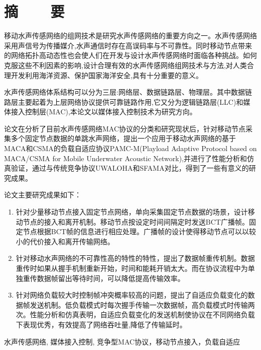 \renewcommand{\baselinestretch}{1.5}
\fontsize{12pt}{13pt}\selectfont


\chapter{摘~~~~要}

移动水声传感网络的组网技术是研究水声传感网络的重要方向之一。水声传感网络采用声信号为传播媒介,水声通信时存在高误码率与不可靠性。同时移动节点带来的网络拓扑高动态性也会使人们在开发与设计水声传感网络时面临各种挑战。如何克服这些不利因素的影响,设计合理有效的水声传感网络组网技术与方法,对人类合理开发利用海洋资源、保护国家海洋安全,具有十分重要的意义。

水声传感网络体系结构可以分为三层:网络层、数据链路层、物理层。其中数据链路层主要起着为上层网络协议提供可靠链路作用,它又分为逻辑链路层(LLC)和媒体接入控制层(MAC),本论文以媒体接入控制技术为研究方向。

论文在分析了目前水声传感网络MAC协议的分类和研究现状后，针对移动节点采集多个固定节点数据的单跳水声网络，提出一个应用于移动水声网络的基于MACA和CSMA的负载自适应协议PAMC-M(Playload Adaptive Protocol based on MACA/CSMA for Mobile Underwater Acoustic Network),并进行了性能分析和仿真验证，通过与传统竞争协议UWALOHA和SFAMA对比，得到了一些有意义的研究成果。

论文主要研究成果如下：
\vspace{-10pt}
\begin{enumerate}
	\item 针对少量移动节点接入固定节点网络，单向采集固定节点数据的场景，设计移动节点的接入和离开机制。移动节点按设定时间间隔定时发送BCT广播帧。固定节点根据BCT帧的信息进行相应处理。广播帧的设计使得移动节点可以以较小的代价接入和离开传输网络。
	\item 针对移动水声网络的不可靠性高的特性的特性，提出了数据帧重传机制。数据重传时如果从握手机制重新开始，时间和能耗开销太大。而在协议流程中为单独重传数据帧留出等待时间，可以降低提高传输效率。
	\item 
	针对网络负载较大时控制帧冲突概率较高的问题，提出了自适应负载变化的数据帧发送机制。低负载模式时每次握手传输一次数据帧，高负载模式时传输两次。性能分析和仿真表明，自适应负载变化的发送机制使协议在不同网络负载下表现优秀，有效提高了网络吞吐量,降低了传输延时。
\end{enumerate}
\vspace{-10pt}

\vspace{1em}
 \quad 水声传感网络, 媒体接入控制, 竞争型MAC协议，移动节点接入，负载自适应

\clearpage
\endinput
